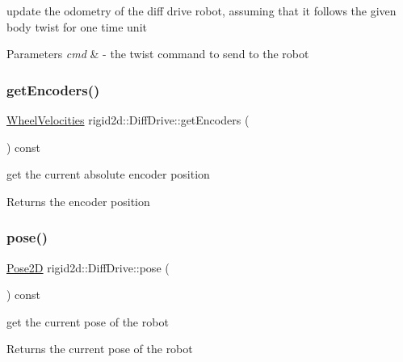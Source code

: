 update the odometry of the diff drive robot, assuming that it follows the given body twist for one time unit 


\begin{DoxyParams}{Parameters}
{\em cmd} & -\/ the twist command to send to the robot \\
\hline
\end{DoxyParams}
\mbox{\label{classrigid2d_1_1DiffDrive_add7b4cb6d5e4edaffdcefbfa930a2f43}} 
\subsubsection{\texorpdfstring{get\+Encoders()}{getEncoders()}}
{\footnotesize\ttfamily \hyperlink{structrigid2d_1_1WheelVelocities}{Wheel\+Velocities} rigid2d\+::\+Diff\+Drive\+::get\+Encoders (\begin{DoxyParamCaption}{ }\end{DoxyParamCaption}) const}

get the current absolute encoder position \begin{DoxyReturn}{Returns}
the encoder position 
\end{DoxyReturn}
\mbox{\label{classrigid2d_1_1DiffDrive_a3af583df8981ddfb338bba07b7297ff2}} 
\subsubsection{\texorpdfstring{pose()}{pose()}}
{\footnotesize\ttfamily \hyperlink{structrigid2d_1_1Pose2D}{Pose2D} rigid2d\+::\+Diff\+Drive\+::pose (\begin{DoxyParamCaption}{ }\end{DoxyParamCaption}) const}



get the current pose of the robot 

\begin{DoxyReturn}{Returns}
the current pose of the robot 
\end{DoxyReturn}
\mbox{\label{classrigid2d_1_1DiffDrive_afffa18508c27b368767182dba1a7d367}} 
